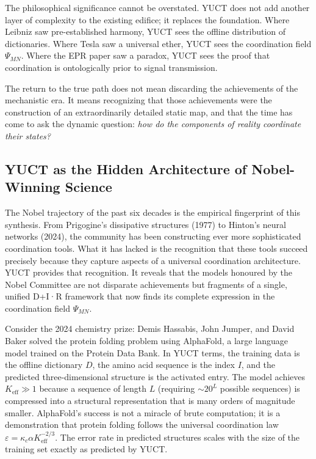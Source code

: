 \documentclass[12pt,a4paper]{article}
\begin{document}
	The philosophical significance cannot be overstated. YUCT does not add another layer of complexity to the existing edifice; it replaces the foundation. Where Leibniz saw pre-established harmony, YUCT sees the offline distribution of dictionaries. Where Tesla saw a universal ether, YUCT sees the coordination field \(\Psi_{MN}\). Where the EPR paper saw a paradox, YUCT sees the proof that coordination is ontologically prior to signal transmission.
	
	The return to the true path does not mean discarding the achievements of the mechanistic era. It means recognizing that those achievements were the construction of an extraordinarily detailed static map, and that the time has come to ask the dynamic question: \emph{how do the components of reality coordinate their states?}
	
	\subsection{YUCT as the Hidden Architecture of Nobel-Winning Science}
	
	The Nobel trajectory of the past six decades is the empirical fingerprint of this synthesis. From Prigogine's dissipative structures (1977) to Hinton's neural networks (2024), the community has been constructing ever more sophisticated coordination tools. What it has lacked is the recognition that these tools succeed precisely because they capture aspects of a universal coordination architecture. YUCT provides that recognition. It reveals that the models honoured by the Nobel Committee are not disparate achievements but fragments of a single, unified D+I·R framework that now finds its complete expression in the coordination field \(\Psi_{MN}\).
	
	Consider the 2024 chemistry prize: Demis Hassabis, John Jumper, and David Baker solved the protein folding problem using AlphaFold, a large language model trained on the Protein Data Bank. In YUCT terms, the training data is the offline dictionary \(D\), the amino acid sequence is the index \(I\), and the predicted three-dimensional structure is the activated entry. The model achieves \(K_{\mathrm{eff}} \gg 1\) because a sequence of length \(L\) (requiring \(\sim 20^L\) possible sequences) is compressed into a structural representation that is many orders of magnitude smaller. AlphaFold's success is not a miracle of brute computation; it is a demonstration that protein folding follows the universal coordination law \(\varepsilon = \kappa_c \alpha K_{\mathrm{eff}}^{-2/3}\). The error rate in predicted structures scales with the size of the training set exactly as predicted by YUCT.
	
\end{document}
